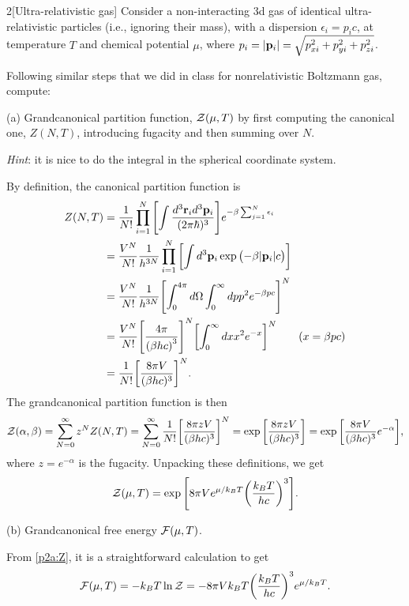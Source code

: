 \documentclass[12pt]{article}
\begin{document}
\begin{problem}{2}[Ultra-relativistic gas]
Consider a non-interacting 3d gas of identical ultra-relativistic particles
(i.e., ignoring their mass), with a dispersion $\epsilon_i=p_ic$, at temperature
$T$ and chemical potential $\mu$, where
$p_i=\abs{\vb{p}_i}=\sqrt{p_{xi}^2+p_{yi}^2+p_{zi}^2}$.

Following similar steps that we did in class for nonrelativistic Boltzmann gas,
compute:

(a) Grandcanonical partition function, $\mathcal{Z}(\mu,T)$ by first computing the
canonical one, $Z(N,T)$, introducing fugacity and then summing over $N$.

\textit{Hint}: it is nice to do the integral in the spherical coordinate system.
\begin{solution}
By definition, the canonical partition function is
\begin{align}
    Z(N,T)
    &=\frac1{N!}\prod_{i=1}^N\qty[\int\frac{d^3\vb{r}_id^3\vb{p}_i}{(2\pi\hbar)^3}]e^{-\beta\sum_{j=1}^N\epsilon_i}\notag\\
    &=\frac{V^N}{N!}\frac{1}{h^{3N}}\prod_{i=1}^N\qty[\int
    d^3\vb{p}_i\exp\qty(-\beta\abs{\vb{p}_i}c)]\notag\\
    &=\frac{V^N}{N!}\frac1{h^{3N}}\qty[\int_0^{4\pi}d\Omega\int_0^\infty dp
p^2e^{-\beta pc}]^N\notag\\
    &=\frac{V^N}{N!}\qty[\frac{4\pi}{\qty(\beta hc)^3}]^N
        \qty[\int_0^\infty dxx^2e^{-x}]^N\tag{$x=\beta pc$}\\
    &=\frac1{N!}\qty[\frac{8\pi V}{(\beta hc)^3}]^N.
\end{align}
The grandcanonical partition function is then
\begin{align}\label{p2a:Zb}
    \mathcal{Z}(\alpha,\beta)=\sum_{N=0}^\infty z^NZ(N,T)
    =\sum_{N=0}^\infty\frac1{N!}\qty[\frac{8\pi zV}{(\beta hc)^3}]^N
    =\exp\qty[\frac{8\pi zV}{(\beta hc)^3}]
    =\exp\qty[\frac{8\pi V}{(\beta hc)^3}e^{-\alpha}],
\end{align}
where $z=e^{-\alpha}$ is the fugacity. Unpacking these definitions, we get
\begin{equation}\label{p2a:Z}
    \mathcal{Z}(\mu,T)=\exp\qty[8\pi Ve^{\mu/k_BT}\qty(\frac{k_BT}{hc})^3].
\end{equation}
\end{solution}

(b) Grandcanonical free energy $\mathcal{F}(\mu,T)$.
\begin{solution}
From \eqref{p2a:Z}, it is a straightforward calculation to get
\begin{equation}
    \mathcal{F}(\mu,T)=-k_BT\ln\mathcal{Z}
    =-8\pi Vk_BT\qty(\frac{k_BT}{hc})^3e^{\mu/k_BT}.
\end{equation}
\end{solution}


\end{problem}
\end{document}
